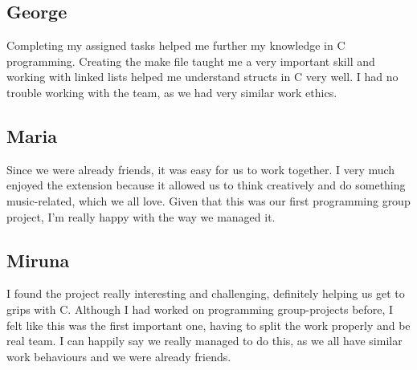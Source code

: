 \documentclass[11pt]{article}
\begin{document}
\subsection{George}
Completing my assigned tasks helped me further my knowledge in C programming. Creating the make file taught me a very important skill and working with linked lists helped me understand structs in C very well. I had no trouble working with the team, as we had very similar work ethics.

\subsection{Maria}
Since we were already friends, it was easy for us to work together. I very much enjoyed the extension because it allowed us to think creatively and do something music-related, which we all love. Given that this was our first programming group project, I’m really happy with the way we managed it.
\subsection{Miruna}
I found the project really interesting and challenging, definitely helping us get to grips with C. Although I had worked on programming group-projects before, I felt like this was the first important one, having to split the work properly and be real team. I can happily say we really managed to do this, as we all have similar work behaviours and we were already friends.
\end{document}
